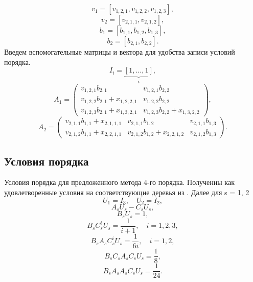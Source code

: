 \documentclass[a4paper,article,14pt]{extarticle}
\begin{document}
\begin{equation}
    v_{1} = \left[
    v_{1,2,1}, v_{1,2,2}, v_{1,2,3}
    \right],
\end{equation}
\begin{equation}
    v_{2} = \left[
    v_{2,1,1}, v_{2,1,2}
    \right],
\end{equation}
\begin{equation}
    b_{1} = \left[
    b_{1,1}, b_{1,2}, b_{1,3}
    \right],
\end{equation}
\begin{equation}
    b_{2} = \left[
    b_{2,1}, b_{2,2}
    \right].
\end{equation}
Введем вспомогательные матрицы и вектора для удобства записи условий порядка.
\begin{equation}
I_{i} = \underbrace{\left[
    1, \dotsc, 1
    \right]}_{i},
\end{equation}
\begin{equation}
A_{1} = 
\begin{pmatrix}
    v_{1,2,1} b_{2,1} & v_{1,2,1} b_{2,2} \\
    v_{1,2,2} b_{2,1} + x_{1,2,2,1} & v_{1,2,2} b_{2,2} \\
    v_{1,2,3} b_{2,1} + x_{1,3,2,1} & v_{1,2,3} b_{2,2} + x_{1,3,2,2}
\end{pmatrix},
\end{equation}
\begin{equation}
A_{2} = 
\begin{pmatrix}
    v_{2,1,1} b_{1,1} + x_{2,1,1,1} & v_{2,1,1} b_{1,2} & v_{2,1,1} b_{1,3}\\
    v_{2,1,2} b_{1,1} + x_{2,2,1,1} & v_{2,1,2} b_{1,2} + x_{2,2,1,2} & v_{2,1,2} b_{1,3}
\end{pmatrix}.
\end{equation}

\subsection{Условия порядка}\label{order_conditions}
Условия порядка для предложенного метода 4-го порядка. Полученны как удовлетворенные условия на соответствующие деревья из \cite{tree}.
Далее для s = 1, 2
\begin{equation}
U_{1} = I_{3}, \quad U_{2} = I_{2},
\end{equation}
\begin{equation}
A_{s} U_{s} - C_{s} U_{s},
\end{equation}
\begin{equation}
B_{s} U_{s} = 1,
\end{equation}
\begin{equation}
B_{s} C_{s}^{i} U_{s} = \frac{1}{i+1}, \quad i = 1, 2, 3,
\end{equation}
\begin{equation}
B_{s} A_{s} C_{s}^{i} U_{s} = \frac{1}{6i}, \quad i = 1, 2,
\end{equation}
\begin{equation}
B_{s} C_{s} A_{s} C_{s} U_{s} = \frac{1}{8},
\end{equation}
\begin{equation}
B_{s} A_{s} A_{s} C_{s} U_{s} = \frac{1}{24}.
\end{equation}
\end{document}

